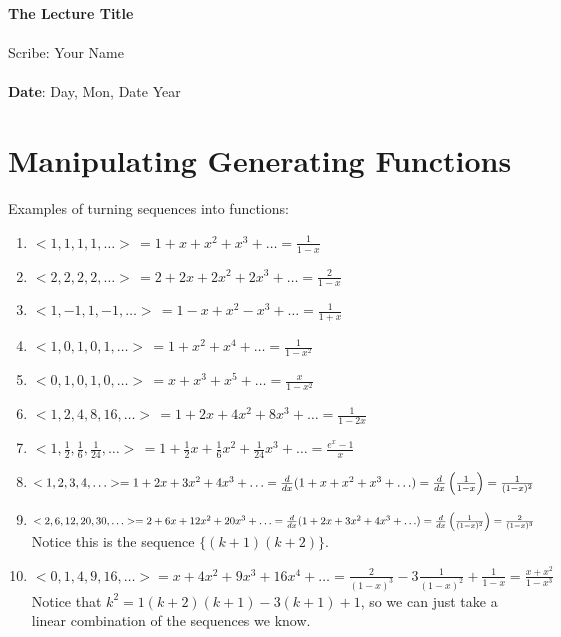 \documentclass[11pt,twosided]{article}
\def\titlestring{The Lecture Title}
\def\scribestring{Your Name}
\def\datestring{Day, Mon, Date Year}
\begin{document}
\thispagestyle{plain}  %

\noindent
{\LARGE \textbf{\titlestring}}\\\\
%
{\Large Scribe: \scribestring}\\ \\
{\textbf{Date}: \datestring}


\noindent

\section{Manipulating Generating Functions}
Examples of turning sequences into functions: 
\begin{enumerate}
\item $<1, 1, 1, 1, \ldots > \, = 1 + x + x^2 + x^3 + \ldots = \frac{1}{1-x}$
\item $<2, 2, 2, 2, \ldots > \, = 2 + 2x + 2x^2 + 2x^3 + \ldots = \frac{2}{1-x}$
\item  $<1, -1, 1, -1, \ldots > \,= 1 - x + x^2 - x^3 + \ldots = \frac{1}{1+x}$
\item $<1, 0, 1, 0, 1, \ldots > \,= 1 + x^2 + x^4 + \ldots = \frac{1}{1-x^2}$
\item $<0, 1, 0, 1, 0, \ldots >\, = x + x^3 + x^5 + \ldots = \frac{x}{1-x^2}$
\item $<1, 2, 4, 8, 16, \ldots > \, = 1 + 2x + 4x^2 + 8x^3 + \ldots = \frac{1}{1-2x}$
\item $<1, \frac{1}{2}, \frac{1}{6}, \frac{1}{24}, \ldots> \, = 1 + \frac{1}{2} x + \frac{1}{6} x^2 + \frac{1}{24}x^3 + \ldots = \frac{e^x - 1}{x}$
\item $<1, 2, 3, 4, \ldots> = 1 + 2x + 3x^2 + 4x^3 + \ldots = \frac{d }{d x}(1 + x + x^2 + x^3 + \ldots) = \frac{d }{d x}\left(\frac{1}{1-x}\right) = \frac{1}{(1-x)^2} $
\item $<2, 6, 12, 20, 30, \ldots> = 2 + 6x + 12x^2 + 20x^3 + \ldots = \frac{d }{d x}(1 + 2x + 3x^2 + 4x^3 + \ldots) = \frac{d }{d x}\left(\frac{1}{(1-x)^2}\right) = \frac{2}{(1-x)^3} $ \\
Notice this is the sequence $\{ (k+1)(k+2) \}$.
\item $<0, 1, 4, 9, 16, \ldots> = x + 4x^2 + 9x^3 + 16x^4 + \ldots = \frac{2}{(1-x)^3} -3\frac{1}{(1-x)^2} + \frac{1}{1-x} = \frac{x+ x^2}{1-x^3}$\\
Notice that $k^2 = 1(k+2)(k+1) - 3(k+1) + 1$, so we can just take a linear combination of the sequences we know. 
\end{enumerate}
\end{document}
